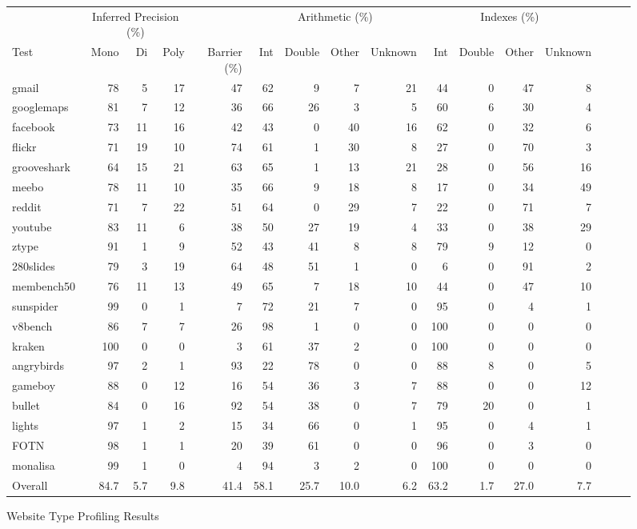 \begin{figure*}
\begin{center}
\begin{tabular}{lrrrrrrrrrrrrrrr}
\toprule
& \multicolumn{3}{c}{Inferred Precision (\%)} &
& \multicolumn{4}{c}{Arithmetic (\%)}
& \multicolumn{4}{c}{Indexes (\%)} \\

\cmidrule(r){2-4}
\cmidrule(r){6-9}
\cmidrule{10-13}

Test
& Mono & Di & Poly & Barrier (\%)
& Int & Double & Other & Unknown
& Int & Double & Other & Unknown \\
\midrule
gmail          & 78 & 5  & 17 & 47 & 62 & 9  & 7  & 21 & 44 & 0 & 47 & 8 \\
googlemaps     & 81 & 7  & 12 & 36 & 66 & 26 & 3  & 5  & 60 & 6 & 30 & 4 \\
facebook       & 73 & 11 & 16 & 42 & 43 & 0 & 40 & 16 & 62 & 0 & 32 & 6 \\
flickr         & 71 & 19 & 10 & 74 & 61 & 1 & 30 & 8 & 27 & 0 & 70 & 3 \\
grooveshark    & 64 & 15 & 21 & 63 & 65 & 1 & 13 & 21 & 28 & 0 & 56 & 16 \\
meebo          & 78 & 11 & 10 & 35 & 66 & 9 & 18 & 8 & 17 & 0 & 34 & 49 \\
reddit         & 71 & 7 & 22 & 51 & 64 & 0 & 29 & 7 & 22 & 0 & 71 & 7 \\
youtube        & 83 & 11 & 6 & 38 & 50 & 27 & 19 & 4 & 33 & 0 & 38 & 29 \\
ztype          & 91 & 1 & 9 & 52 & 43 & 41 & 8 & 8 & 79 & 9 & 12 & 0 \\
280slides      & 79 & 3 & 19 & 64 & 48 & 51 & 1 & 0 & 6 & 0 & 91 & 2 \\
membench50     & 76 & 11 & 13 & 49 & 65 & 7  & 18 & 10 & 44 & 0 & 47 & 10 \\
\midrule
sunspider      & 99 & 0  & 1  & 7  & 72 & 21 & 7  & 0  & 95 & 0 & 4  & 1  \\
v8bench        & 86 & 7  & 7  & 26 & 98 & 1  & 0  & 0  & 100 & 0 & 0 & 0  \\
kraken         & 100 & 0 & 0  & 3  & 61 & 37 & 2  & 0  & 100 & 0 & 0 & 0  \\
\midrule
angrybirds     & 97 & 2 & 1 & 93 & 22 & 78 & 0 & 0 & 88 & 8 & 0 & 5 \\
gameboy        & 88 & 0 & 12 & 16 & 54 & 36 & 3 & 7 & 88 & 0 & 0 & 12 \\
bullet         & 84 & 0 & 16 & 92 & 54 & 38 & 0 & 7 & 79 & 20 & 0 & 1 \\
lights         & 97 & 1 & 2 & 15 & 34 & 66 & 0 & 1 & 95 & 0 & 4 & 1 \\
FOTN           & 98 & 1 & 1 & 20 & 39 & 61 & 0 & 0 & 96 & 0 & 3 & 0 \\
monalisa       & 99 & 1 & 0 & 4 & 94 & 3 & 2 & 0 & 100 & 0 & 0 & 0 \\
\midrule
Overall        & 84.7 & 5.7 & 9.8 & 41.4 & 58.1 & 25.7 & 10.0 & 6.2 & 63.2 & 1.7 & 27.0 & 7.7 \\
\bottomrule
\end{tabular}
\end{center}
\nocaptionrule \caption{Website Type Profiling Results}
\label{fig:polymorphism}
\end{figure*}

